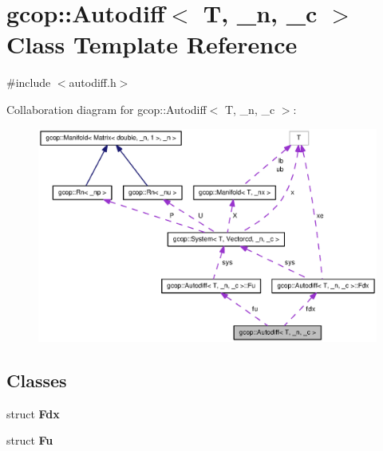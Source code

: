 \section{gcop\-:\-:\-Autodiff$<$ \-T, \-\_\-n, \-\_\-c $>$ \-Class \-Template \-Reference}
\label{classgcop_1_1Autodiff}


{\ttfamily \#include $<$autodiff.\-h$>$}



\-Collaboration diagram for gcop\-:\-:\-Autodiff$<$ \-T, \-\_\-n, \-\_\-c $>$\-:
\nopagebreak
\begin{figure}[H]
\begin{center}
\leavevmode
\includegraphics[width=350pt]{classgcop_1_1Autodiff__coll__graph}
\end{center}
\end{figure}
\subsection*{\-Classes}
\begin{DoxyCompactItemize}
\item 
struct {\bf \-Fdx}
\item 
struct {\bf \-Fu}
\end{DoxyCompactItemize}
